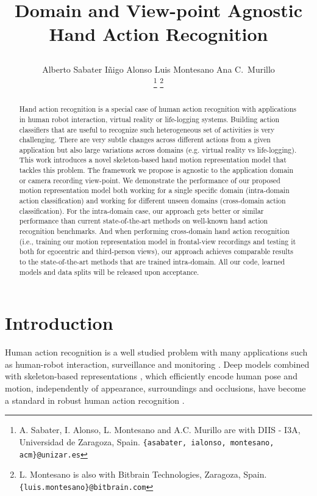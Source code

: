 \documentclass[letterpaper, 10 pt, conference]{ieeeconf}
\title{\LARGE \bf
Domain and View-point Agnostic Hand Action Recognition



}
\author{Alberto Sabater \hspace{0.5cm} Iñigo Alonso  \hspace{0.5cm} Luis Montesano \hspace{0.5cm} Ana C.~Murillo

\thanks{ A. Sabater, I. Alonso, L. Montesano and A.C. Murillo are with 
DIIS - I3A, Universidad de Zaragoza, Spain. {\tt\small \{asabater, ialonso, montesano, acm\}@unizar.es}
}
\thanks{  L. Montesano is also with Bitbrain Technologies, Zaragoza, Spain. {\tt\small \{luis.montesano\}@bitbrain.com}
}
}
\begin{document}
\maketitle
\thispagestyle{empty}
\pagestyle{empty}


\begin{abstract}
Hand action recognition is a special case of human action recognition with applications in human robot interaction, virtual reality or life-logging systems. Building action classifiers that are useful to recognize such heterogeneous set of activities is very challenging. There are very subtle changes across different actions from a given application but also large variations across domains (e.g. virtual reality vs life-logging).
This work introduces a novel skeleton-based hand motion representation model that tackles this problem. The framework we propose is agnostic to the application domain or camera recording view-point. 
We demonstrate the performance of our proposed motion representation model both working for a single specific domain (intra-domain action classification) and working for different unseen domains (cross-domain action classification). For the intra-domain case, our approach gets better or similar performance than current state-of-the-art methods on well-known hand action recognition benchmarks.
And when performing cross-domain hand action recognition (i.e., training our motion representation model in frontal-view recordings and testing it both for egocentric and third-person views), our approach achieves comparable results to the state-of-the-art methods that are trained intra-domain.
All our code, learned models and data splits will be released upon acceptance.

\end{abstract}

    


\section{Introduction}

Human action recognition is a well studied problem with many applications such as human-robot interaction, surveillance and monitoring \cite{krupke2018comparison, tanwani2017generative}. Deep models combined with skeleton-based representations \cite{bates2017line, moon2018v2v}, which efficiently encode human pose and motion, independently of appearance, surroundings and occlusions, have become a standard in robust human action recognition \cite{perez2019interaction, zhang2019view}.
\end{document}
